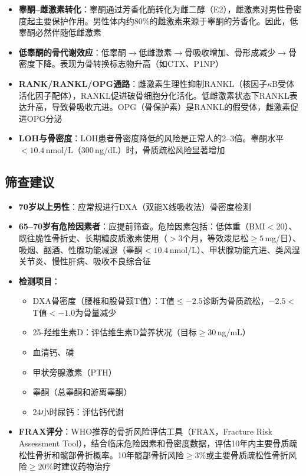 \begin{itemize}[leftmargin=2cm]
	\item \textbf{睾酮--雌激素转化}：睾酮通过芳香化酶转化为雌二醇（E2），雌激素对男性骨密度起主要保护作用。男性体内约80\%的雌激素来源于睾酮的芳香化。因此，低睾酮必然伴随低雌激素
	\item \textbf{低睾酮的骨代谢效应}：低睾酮$\rightarrow$低雌激素$\rightarrow$骨吸收增加、骨形成减少$\rightarrow$骨密度下降。表现为骨转换标志物升高（如CTX、P1NP）
	\item \textbf{RANK/RANKL/OPG通路}：雌激素生理性抑制RANKL（核因子$\kappa$B受体活化因子配体），RANKL促进破骨细胞分化活化。低雌激素状态下RANKL表达升高，导致骨吸收亢进。OPG（骨保护素）是RANKL的假受体，雌激素促进OPG分泌
	\item \textbf{LOH与骨密度}：LOH患者骨密度降低的风险是正常人的2--3倍。睾酮水平$<10.4\,$nmol/L（300\,ng/dL）时，骨质疏松风险显著增加
\end{itemize}

\subsection{筛查建议}

\begin{itemize}[leftmargin=2cm]
	\item \textbf{70岁以上男性}：应常规进行DXA（双能X线吸收法）骨密度检测
	\item \textbf{65--70岁有危险因素者}：应提前筛查。危险因素包括：低体重（BMI$<$20）、既往脆性骨折史、长期糖皮质激素使用（$>3$个月，等效泼尼松$\geq 5\,$mg/日）、吸烟、酗酒、性腺功能减退（睾酮$<10.4\,$nmol/L）、甲状腺功能亢进、类风湿关节炎、慢性肝病、吸收不良综合征
	\item \textbf{检测项目}：
	\begin{itemize}
		\item DXA骨密度（腰椎和股骨颈T值）：T值$\leq -2.5$诊断为骨质疏松，$-2.5 < $T值$< -1.0$为骨量减少
		\item 25-羟维生素D：评估维生素D营养状况（目标$\geq 30\,$ng/mL）
		\item 血清钙、磷
		\item 甲状旁腺激素（PTH）
		\item 睾酮（总睾酮和游离睾酮）
		\item 24小时尿钙：评估钙代谢
	\end{itemize}
	\item \textbf{FRAX评分}：WHO推荐的骨折风险评估工具（FRAX，Fracture Risk Assessment Tool），结合临床危险因素和骨密度数据，评估10年内主要骨质疏松性骨折和髋部骨折概率。10年髋部骨折风险$\geq 3\%$或主要骨质疏松性骨折风险$\geq 20\%$时建议药物治疗
\end{itemize}

